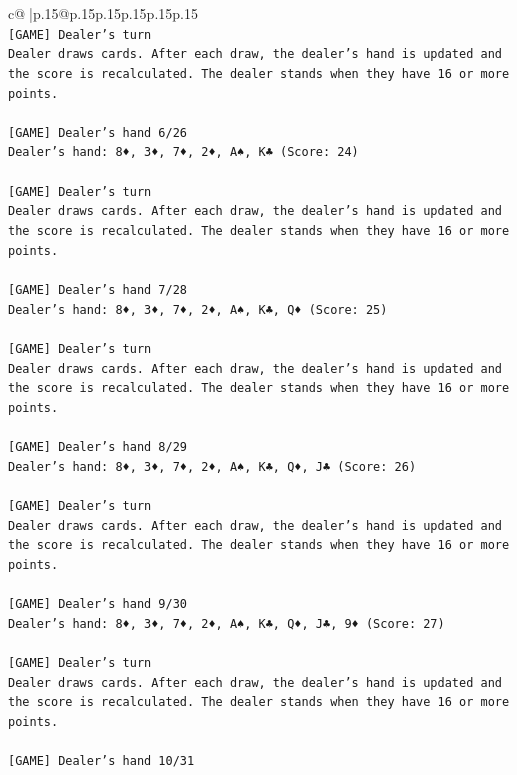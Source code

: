 \documentclass{article}
\begin{document}
{\begin{supertabular}{c@{$\;$}|p{.15\linewidth}@{}p{.15\linewidth}p{.15\linewidth}p{.15\linewidth}p{.15\linewidth}p{.15\linewidth}}
{{{\\ 
\texttt{{[}GAME{]} Dealer's turn} \\
\texttt{Dealer draws cards. After each draw, the dealer's hand is updated and the score is recalculated. The dealer stands when they have 16 or more points.} \\
\\ 
\texttt{{[}GAME{]} Dealer's hand 6/26} \\
\texttt{Dealer's hand: 8♦, 3♦, 7♦, 2♦, A♠, K♣ (Score: 24)} \\
\\ 
\texttt{{[}GAME{]} Dealer's turn} \\
\texttt{Dealer draws cards. After each draw, the dealer's hand is updated and the score is recalculated. The dealer stands when they have 16 or more points.} \\
\\ 
\texttt{{[}GAME{]} Dealer's hand 7/28} \\
\texttt{Dealer's hand: 8♦, 3♦, 7♦, 2♦, A♠, K♣, Q♦ (Score: 25)} \\
\\ 
\texttt{{[}GAME{]} Dealer's turn} \\
\texttt{Dealer draws cards. After each draw, the dealer's hand is updated and the score is recalculated. The dealer stands when they have 16 or more points.} \\
\\ 
\texttt{{[}GAME{]} Dealer's hand 8/29} \\
\texttt{Dealer's hand: 8♦, 3♦, 7♦, 2♦, A♠, K♣, Q♦, J♣ (Score: 26)} \\
\\ 
\texttt{{[}GAME{]} Dealer's turn} \\
\texttt{Dealer draws cards. After each draw, the dealer's hand is updated and the score is recalculated. The dealer stands when they have 16 or more points.} \\
\\ 
\texttt{{[}GAME{]} Dealer's hand 9/30} \\
\texttt{Dealer's hand: 8♦, 3♦, 7♦, 2♦, A♠, K♣, Q♦, J♣, 9♦ (Score: 27)} \\
\\ 
\texttt{{[}GAME{]} Dealer's turn} \\
\texttt{Dealer draws cards. After each draw, the dealer's hand is updated and the score is recalculated. The dealer stands when they have 16 or more points.} \\
\\ 
\texttt{{[}GAME{]} Dealer's hand 10/31} \\
}}}
\end{supertabular}}
\end{document}
